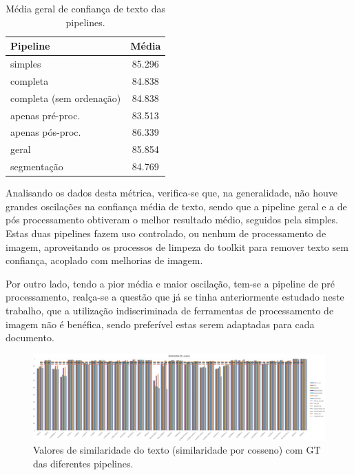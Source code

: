 \begin{table}[H]
	\centering
	\begin{tabular}{|l|c|}
		\hline
		\textbf{Pipeline} & \textbf{Média} \\ \hline
		simples & 85.296 				   \\ \hline
		completa & 84.838 				   \\ \hline
		completa (sem ordenação) & 84.838  \\ \hline
		apenas pré-proc. & 83.513 		   \\ \hline
		apenas pós-proc. & 86.339 		   \\ \hline
		geral & 85.854 					   \\ \hline
		segmentação & 84.769 			   \\ \hline
	\end{tabular}
	\caption{Média geral de confiança de texto das pipelines.}
\end{table}


Analisando os dados desta métrica, verifica-se que, na generalidade, não houve grandes oscilações na confiança média de texto, sendo que a pipeline geral e a de pós processamento obtiveram o melhor resultado médio, seguidos pela simples. Estas duas pipelines fazem uso controlado, ou nenhum de processamento de imagem, aproveitando os processos de limpeza do toolkit para remover texto sem confiança, acoplado com melhorias de imagem.

Por outro lado, tendo a pior média e maior oscilação, tem-se a pipeline de pré processamento, realça-se a questão que já se tinha anteriormente estudado neste trabalho, que a utilização indiscriminada de ferramentas de processamento de imagem não é benéfica, sendo preferível estas serem adaptadas para cada documento. 


\begin{figure}[H]
	\centering
	\hspace*{-2cm}
	\includegraphics[width=1.1\textwidth]{images/resultados/graph_gt_similiraty_cosine.png}
	\caption{Valores de similaridade do texto (similaridade por cosseno) com GT das diferentes pipelines.}
	\label{fig:graph_gt_similiraty_cosine}
\end{figure}


